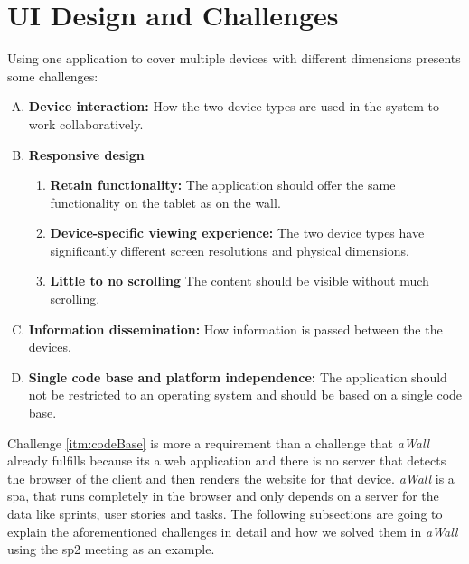 \documentclass{sigchi}
\begin{document}
\section{UI Design and Challenges}
Using one application to cover multiple devices with different dimensions presents some challenges:

\begin{enumerate}[A.]
	\item \textbf{Device interaction:} How the two device types are used in the system to work collaboratively.~\label{itm:interaction}
	
	\item \textbf{Responsive design}
	\begin{enumerate}[1.]
			\item \textbf{Retain functionality:} The application should offer the same functionality on the tablet as on the wall.~\label{itm:retainFunc}
					
			\item \textbf{Device-specific viewing experience:} The two device types have significantly different screen resolutions and physical dimensions.~\label{itm:rwdViewingExp}
			
			\item \textbf{Little to no scrolling} The content should be visible without much scrolling.~\label{itm:scrolling}
	\end{enumerate}

	\item \textbf{Information dissemination:} How information is passed between the the devices.~\label{itm:information}
	
	\item \textbf{Single code base and platform independence:} The application should not be restricted to an operating system and should be based on a single code base.~\label{itm:codeBase}
\end{enumerate}

Challenge \ref{itm:codeBase} is more a requirement than a challenge that \textit{aWall} already fulfills because its a web application and there is no server that detects the browser of the client and then renders the website for that device.
\textit{aWall} is a \gls{spa}, that runs completely in the browser and only depends on a server for the data like sprints, user stories and tasks.
The following subsections are going to explain the aforementioned challenges in detail and how we solved them in \textit{aWall} using the \gls{sp2} meeting as an example.
\end{document}
